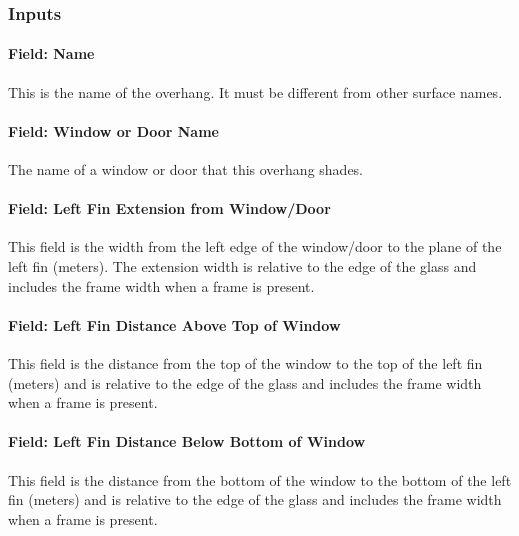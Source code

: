 \subsubsection{Inputs}\label{inputs-28-002}

\paragraph{Field: Name}\label{field-name-26-003}

This is the name of the overhang. It must be different from other surface names.

\paragraph{Field: Window or Door Name}\label{field-window-or-door-name-2}

The name of a window or door that this overhang shades.

\paragraph{Field: Left Fin Extension from Window/Door}\label{field-left-fin-extension-from-windowdoor}

This field is the width from the left edge of the window/door to the plane of the left fin (meters). The extension width is relative to the edge of the glass and includes the frame width when a frame is present.

\paragraph{Field: Left Fin Distance Above Top of Window}\label{field-left-fin-distance-above-top-of-window}

This field is the distance from the top of the window to the top of the left fin (meters) and is relative to the edge of the glass and includes the frame width when a frame is present.

\paragraph{Field: Left Fin Distance Below Bottom of Window}\label{field-left-fin-distance-below-bottom-of-window}

This field is the distance from the bottom of the window to the bottom of the left fin (meters) and is relative to the edge of the glass and includes the frame width when a frame is present.


